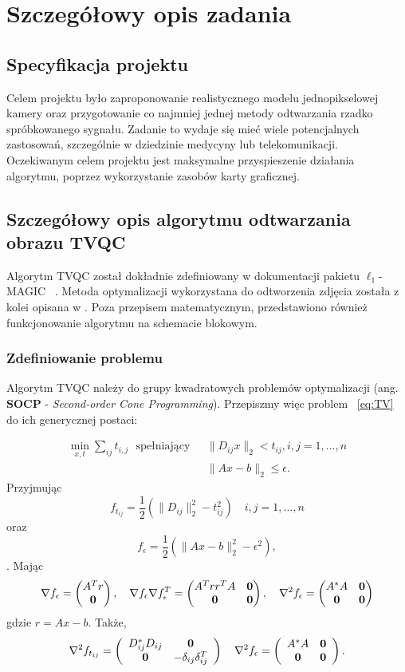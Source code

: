 \section{Szczegółowy opis zadania}
\subsection{Specyfikacja projektu}
Celem projektu było zaproponowanie realistycznego modelu jednopikselowej kamery oraz przygotowanie co najmniej jednej metody odtwarzania rzadko spróbkowanego sygnału. Zadanie to wydaje się mieć wiele potencjalnych zastosowań, szczególnie w dziedzinie medycyny lub telekomunikacji. Oczekiwanym celem projektu jest maksymalne przyspieszenie działania algorytmu, poprzez wykorzystanie zasobów karty graficznej. 
\subsection{Szczegółowy opis algorytmu odtwarzania obrazu TVQC}
Algorytm TVQC został dokładnie zdefiniowany w dokumentacji pakietu $\ell_1$-MAGIC ~\cite{L1MagicNotes}. Metoda optymalizacji wykorzystana do odtworzenia zdjęcia została z kolei opisana w \cite{Boyd2004}. Poza przepisem matematycznym, przedstawiono również funkcjonowanie algorytmu na schemacie blokowym.
\subsubsection{Zdefiniowanie problemu}
Algorytm TVQC należy do grupy kwadratowych problemów optymalizacji (ang. \textbf{SOCP} - \textit{Second-order Cone Programming}). Przepiszmy więc problem ~\ref{eq:TV} do ich generycznej postaci:

\begin{equation}
\begin{split}
\min_{x,t} \sum_{ij} t_{i,j} \text{~~spełniający~~} &\|D_{ij}x \|_2 < t_{ij}, i,j = 1,...,n \\
&\|Ax - b \|_2 \le \epsilon.
\end{split}
\label{eq:SOCP-generic}
\end{equation}
Przyjmując
\begin{equation}
\label{eq:ftij}
f_{t_{ij}} = \frac{1}{2}\left(\|D_{ij}\|_2^2 - t^2_{ij}\right)\quad i,j=1,\ldots,n
\end{equation}
oraz
\[
f_\epsilon = \frac{1}{2}\left( \|Ax-b\|^2_2 - \epsilon^2\right),
\].
Mając
\[
\nabla f_\epsilon = \left(\begin{matrix} A^Tr \\ \mathbf{0} \end{matrix}\right),\quad 
\nabla f_\epsilon \nabla f_\epsilon^T =
\left(\begin{matrix}  A^Trr^TA & \mathbf{0} \\ \mathbf{0} & \mathbf{0} \end{matrix}\right), \quad
\nabla^2 f_\epsilon = \left(\begin{matrix} A^*A & \mathbf{0} \\
\mathbf{0} & \mathbf{0} \end{matrix}\right)
\]
gdzie $r = Ax - b$.
Także, 
\[
\nabla^2 f_{t_{ij}} = \left(\begin{array}{cc} D_{ij}^*D_{ij} & \mathbf{0} \\
\mathbf{0} & -\delta_{ij}\delta_{ij}^T \end{array}\right)
\quad
\nabla^2 f_\epsilon = \left(\begin{array}{cc} A^*A & \mathbf{0} \\
\mathbf{0} & \mathbf{0} \end{array}\right).
\]

